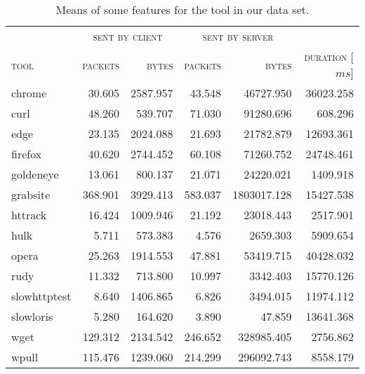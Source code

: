 \begin{table}[H]
	\centering
	\begin{tabular}{lrrrrr}
		\toprule
		 & \multicolumn{2}{c}{\textsc{sent by client}} & \multicolumn{2}{c}{\textsc{sent by server}}\\
		\cmidrule(lr){2-3}
		\cmidrule(lr){4-5}
		\textsc{tool} & \textsc{packets} & \textsc{bytes} & \textsc{packets} & \textsc{bytes} & \textsc{duration} [$ms$]\\
		\midrule
		chrome & 30.605 & 2587.957 & 43.548 & 46727.950 & 36023.258\\
		curl & 48.260 & 539.707 & 71.030 & 91280.696 & 608.296\\
		edge & 23.135 & 2024.088 & 21.693 & 21782.879 & 12693.361\\
		firefox & 40.620 & 2744.452 & 60.108 & 71260.752 & 24748.461\\
		goldeneye & 13.061 & 800.137 & 21.071 & 24220.021 & 1409.918\\
		grabsite & 368.901 & 3929.413 & 583.037 & 1803017.128 & 15427.538\\
		httrack & 16.424 & 1009.946 & 21.192 & 23018.443 & 2517.901\\
		hulk & 5.711 & 573.383 & 4.576 & 2659.303 & 5909.654\\
		opera & 25.263 & 1914.553 & 47.881 & 53419.715 & 40428.032\\
		rudy & 11.332 & 713.800 & 10.997 & 3342.403 & 15770.126\\
		slowhttptest & 8.640 & 1406.865 & 6.826 & 3494.015 & 11974.112\\
		slowloris & 5.280 & 164.620 & 3.890 & 47.859 & 13641.368\\
		wget & 129.312 & 2134.542 & 246.652 & 328985.405 & 2756.862\\
		wpull & 115.476 & 1239.060 & 214.299 & 296092.743 & 8558.179\\
		\bottomrule
	\end{tabular}
	\caption{Means of some features for the tool in our data set.}
	\label{tab:means_application_short}
\end{table}

